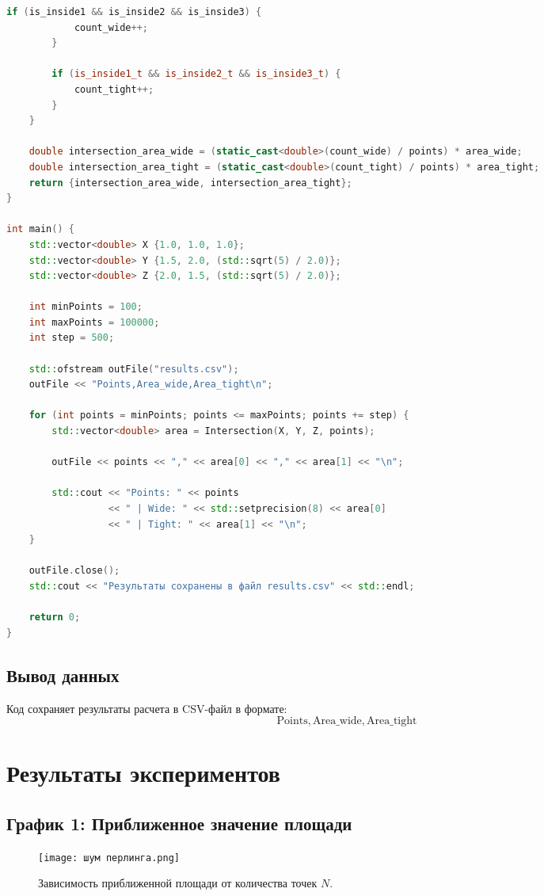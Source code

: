 \documentclass{article}
\begin{document}
\begin{adjustbox}{scale=0.6,center}
\begin{lstlisting}[language=C++]
        if (is_inside1 && is_inside2 && is_inside3) {
            count_wide++;
        }

        if (is_inside1_t && is_inside2_t && is_inside3_t) {
            count_tight++;
        }
    }

    double intersection_area_wide = (static_cast<double>(count_wide) / points) * area_wide;
    double intersection_area_tight = (static_cast<double>(count_tight) / points) * area_tight;
    return {intersection_area_wide, intersection_area_tight};
}

int main() {
    std::vector<double> X {1.0, 1.0, 1.0};
    std::vector<double> Y {1.5, 2.0, (std::sqrt(5) / 2.0)};
    std::vector<double> Z {2.0, 1.5, (std::sqrt(5) / 2.0)};

    int minPoints = 100;
    int maxPoints = 100000;
    int step = 500;

    std::ofstream outFile("results.csv");
    outFile << "Points,Area_wide,Area_tight\n";

    for (int points = minPoints; points <= maxPoints; points += step) {
        std::vector<double> area = Intersection(X, Y, Z, points);

        outFile << points << "," << area[0] << "," << area[1] << "\n";

        std::cout << "Points: " << points
                  << " | Wide: " << std::setprecision(8) << area[0]
                  << " | Tight: " << area[1] << "\n";
    }

    outFile.close();
    std::cout << "Результаты сохранены в файл results.csv" << std::endl;

    return 0;
}
\end{lstlisting}
\end{adjustbox}

\subsection{Вывод данных}
Код сохраняет результаты расчета в CSV-файл в формате:
\[
\text{Points}, \text{Area\_wide}, \text{Area\_tight}
\]

\section{Результаты экспериментов}
\subsection{График 1: Приближенное значение площади}
\begin{figure}[h!]
    \centering
    \texttt{[image: шум перлинга.png]}
    \caption{Зависимость приближенной площади от количества точек \(N\).}
\end{figure}
\end{document}
